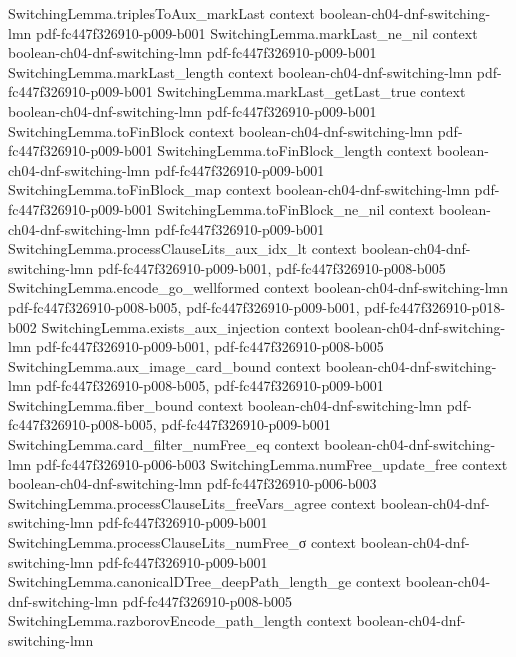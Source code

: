 \begin{theorem}
\proofstep
  {SwitchingLemma.triplesToAux_markLast}
  {context}
  {boolean-ch04-dnf-switching-lmn}
  {pdf-fc447f326910-p009-b001}
\proofstep
  {SwitchingLemma.markLast_ne_nil}
  {context}
  {boolean-ch04-dnf-switching-lmn}
  {pdf-fc447f326910-p009-b001}
\proofstep
  {SwitchingLemma.markLast_length}
  {context}
  {boolean-ch04-dnf-switching-lmn}
  {pdf-fc447f326910-p009-b001}
\proofstep
  {SwitchingLemma.markLast_getLast_true}
  {context}
  {boolean-ch04-dnf-switching-lmn}
  {pdf-fc447f326910-p009-b001}
\proofstep
  {SwitchingLemma.toFinBlock}
  {context}
  {boolean-ch04-dnf-switching-lmn}
  {pdf-fc447f326910-p009-b001}
\proofstep
  {SwitchingLemma.toFinBlock_length}
  {context}
  {boolean-ch04-dnf-switching-lmn}
  {pdf-fc447f326910-p009-b001}
\proofstep
  {SwitchingLemma.toFinBlock_map}
  {context}
  {boolean-ch04-dnf-switching-lmn}
  {pdf-fc447f326910-p009-b001}
\proofstep
  {SwitchingLemma.toFinBlock_ne_nil}
  {context}
  {boolean-ch04-dnf-switching-lmn}
  {pdf-fc447f326910-p009-b001}
\proofstep
  {SwitchingLemma.processClauseLits_aux_idx_lt}
  {context}
  {boolean-ch04-dnf-switching-lmn}
  {pdf-fc447f326910-p009-b001,
    pdf-fc447f326910-p008-b005}
\proofstep
  {SwitchingLemma.encode_go_wellformed}
  {context}
  {boolean-ch04-dnf-switching-lmn}
  {pdf-fc447f326910-p008-b005,
    pdf-fc447f326910-p009-b001,
    pdf-fc447f326910-p018-b002}
\proofstep
  {SwitchingLemma.exists_aux_injection}
  {context}
  {boolean-ch04-dnf-switching-lmn}
  {pdf-fc447f326910-p009-b001,
    pdf-fc447f326910-p008-b005}
\proofstep
  {SwitchingLemma.aux_image_card_bound}
  {context}
  {boolean-ch04-dnf-switching-lmn}
  {pdf-fc447f326910-p008-b005,
    pdf-fc447f326910-p009-b001}
\proofstep
  {SwitchingLemma.fiber_bound}
  {context}
  {boolean-ch04-dnf-switching-lmn}
  {pdf-fc447f326910-p008-b005,
    pdf-fc447f326910-p009-b001}
\proofstep
  {SwitchingLemma.card_filter_numFree_eq}
  {context}
  {boolean-ch04-dnf-switching-lmn}
  {pdf-fc447f326910-p006-b003}
\proofstep
  {SwitchingLemma.numFree_update_free}
  {context}
  {boolean-ch04-dnf-switching-lmn}
  {pdf-fc447f326910-p006-b003}
\proofstep
  {SwitchingLemma.processClauseLits_freeVars_agree}
  {context}
  {boolean-ch04-dnf-switching-lmn}
  {pdf-fc447f326910-p009-b001}
\proofstep
  {SwitchingLemma.processClauseLits_numFree_σ}
  {context}
  {boolean-ch04-dnf-switching-lmn}
  {pdf-fc447f326910-p009-b001}
\proofstep
  {SwitchingLemma.canonicalDTree_deepPath_length_ge}
  {context}
  {boolean-ch04-dnf-switching-lmn}
  {pdf-fc447f326910-p008-b005}
\proofstep
  {SwitchingLemma.razborovEncode_path_length}
  {context}
  {boolean-ch04-dnf-switching-lmn}

\end{theorem}
